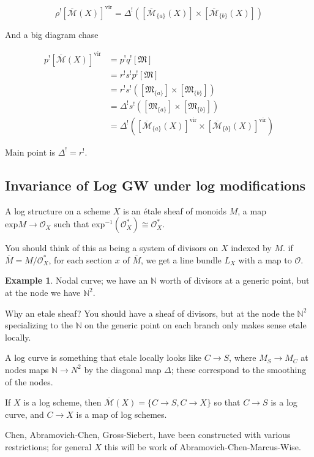 \documentclass{amsart}
\theoremstyle{definition}
\newtheorem{example}[dummy]{Example}
\newcommand{\N}{\mathbb{N}}
\newcommand{\OO}{\mathcal{O}}
\newcommand{\Mbar}{\overline{\mathcal{M}}}
\newcommand{\vir}{\text{vir}}
\begin{document}
$$\rho^![\Mbar(X)]^\vir=\Delta^!([\Mbar_{\{a\}}(X)]\times[\Mbar_{\{b\}}(X)])$$

And a big diagram chase

\begin{align*}
p^![\Mbar(X)]^\vir &= p^!q^![\mathfrak{M}] \\
&=r^!s^!p^![\mathfrak{M}]\\
&=r^!s^!([\mathfrak{M}_{\{a\}}]\times [\mathfrak{M}_{\{b\}}]) \\
&=\Delta^!s^!([\mathfrak{M}_{\{a\}}]\times [\mathfrak{M}_{\{b\}}]) \\
&=\Delta^!([\Mbar_{\{a\}}(X)]^\vir\times [\Mbar_{\{b\}}(X)]^\vir) 
\end{align*}

Main point is $\Delta^!=r^!$.


\subsection{Invariance of Log GW under log modifications}

A log structure on a scheme $X$ is an \'etale sheaf of monoids $M$, a map $\text{exp} M\to \OO_X$ such that $\text{exp}^{-1}(\OO_X^*)\cong \OO_X^*$.



You should think of this as being a system of divisors on $X$ indexed by $M$.
if $\overline{M}=M/\OO_X^*$, for each section $x$ of $\overline{M}$, we get a line bundle $L_X$ with a map to $\OO$.

\begin{example}

 Nodal curve; we have an $\N$ worth of divisors at a generic point, but at the node we have $\N^2$.

\end{example}


Why an etale sheaf?  You should have a sheaf of divisors, but at the node the $\N^2$ specializing to the $\N$ on the generic point on each branch only makes sense etale locally.


A log curve is something that etale locally looks like $C\to S$, where $M_S\to M_C$ at nodes maps $\N\to N^2$ by the diagonal map $\Delta$; these correspond to the smoothing of the nodes.

If $X$ is a log scheme, then $\Mbar(X)=\{C\to S, C\to X\}$ so that $C\to S$ is a log curve, and $C\to X$ is a map of log schemes.

Chen, Abramovich-Chen, Gross-Siebert, have been constructed with various restrictions; for general $X$ this will be work of Abramovich-Chen-Marcus-Wise.
\end{document}
